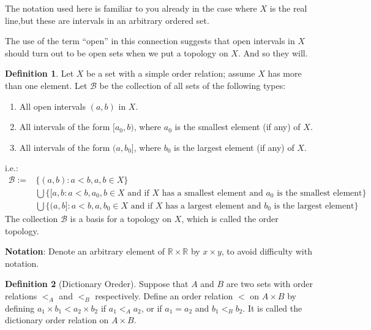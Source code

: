 \documentclass[
]{book}
\providecommand{\tightlist}{%
  \setlength{\itemsep}{0pt}\setlength{\parskip}{0pt}}
\theoremstyle{definition}
\newtheorem{definition}{Definition}[chapter]
\theoremstyle{definition}
\theoremstyle{definition}
\theoremstyle{definition}
\theoremstyle{remark}
\begin{document}
The notation used here is familiar to you already in the case where \(X\) is the real line,but these are intervals in an arbitrary ordered set.

The use of the term ``open'' in this connection suggests that open intervals in \(X\) should turn out to be open sets when
we put a topology on \(X\). And so they will.

\begin{definition}
\protect\hypertarget{def:unnamed-chunk-22}{}\label{def:unnamed-chunk-22}Let \(X\) be a set with a simple order relation; assume \(X\) has more than one element. Let \(\mathcal{B}\) be the collection of all sets of the following types:

\begin{enumerate}
\def\labelenumi{\arabic{enumi}.}
\tightlist
\item
  All open intervals \((a, b)\) in \(X\).
\item
  All intervals of the form \([a_0, b)\), where \(a_0\) is the smallest element (if any) of \(X\).
\item
  All intervals of the form \((a, b_0]\), where \(b_0\) is the largest element (if any) of \(X\).
\end{enumerate}

i.e.:
\[\begin{aligned}
\mathcal{B}:=&\{(a,b):a<b, a,b\in X\}\\
& \bigcup \{[a,b:a<b, a_0,b\in X \text{ and if $X$ has a smallest element and $a_0$ is the smallest element}\}\\
& \bigcup \{(a,b]:a<b, a,b_0\in X \text{ and if $X$ has a largest element and $b_0$ is the largest element}\}
\end{aligned}\]
The collection \(\mathcal{B}\) is a basis for a topology on \(X\), which is called the order topology.
\end{definition}

\textbf{Notation}:
Denote an arbitrary element of \(\mathbb{R} \times \mathbb{R}\) by \(x \times y\), to avoid difficulty with notation.

\begin{definition}[Dictionary Oreder]
\protect\hypertarget{def:unnamed-chunk-23}{}\label{def:unnamed-chunk-23}Suppose that \(A\) and \(B\) are two sets with order relations \(<_{A}\) and \(<_{B}\) respectively. Define an order relation \(<\) on \(A \times B\) by defining \(a_{1} \times b_{1} < a_{2} \times b_{2}\) if \(a_{1} <_{A} a_{2}\), or if \(a_{1} = a_{2}\) and \(b_{1} <_{B} b_{2}\). It is called the dictionary order relation on \(A \times B\).
\end{definition}
\end{document}
